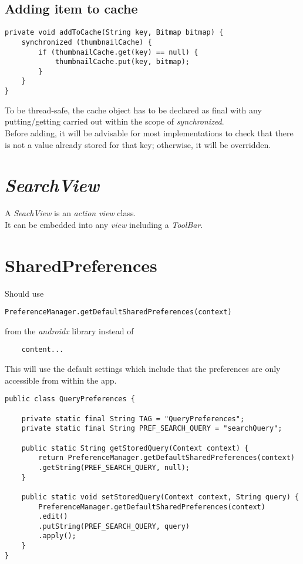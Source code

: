 \documentclass[]{article}
\renewcommand{\it}[1]{\textit{#1}}
\begin{document}
\subsection{Adding item to cache}
\begin{lstlisting}
private void addToCache(String key, Bitmap bitmap) {
	synchronized (thumbnailCache) {
		if (thumbnailCache.get(key) == null) {
			thumbnailCache.put(key, bitmap);
		}
	}
}
\end{lstlisting}
To be thread-safe, the cache object has to be declared as final with any putting/getting carried out within the scope of \it{synchronized}.
\\
Before adding, it will be advisable for most implementations to check that there is not a value already stored for that key; otherwise, it will be overridden.

\section{\it{SearchView}}
A \it{SeachView} is an \it{action view} class.
\\
It can be embedded into any \it{view} including a \it{ToolBar}.

\section{SharedPreferences}
Should use 
\begin{lstlisting}
PreferenceManager.getDefaultSharedPreferences(context)
\end{lstlisting}
from the \it{androidx} library instead of 
\begin{lstlisting}
	content...
\end{lstlisting}
This will use the default settings which include that the preferences are only accessible from within the app.
\begin{lstlisting}
public class QueryPreferences {
	
	private static final String TAG = "QueryPreferences";
	private static final String PREF_SEARCH_QUERY = "searchQuery";
	
	public static String getStoredQuery(Context context) {
		return PreferenceManager.getDefaultSharedPreferences(context)
		.getString(PREF_SEARCH_QUERY, null);
	}
	
	public static void setStoredQuery(Context context, String query) {
		PreferenceManager.getDefaultSharedPreferences(context)
		.edit()
		.putString(PREF_SEARCH_QUERY, query)
		.apply();
	}
}
\end{lstlisting}
\end{document}
